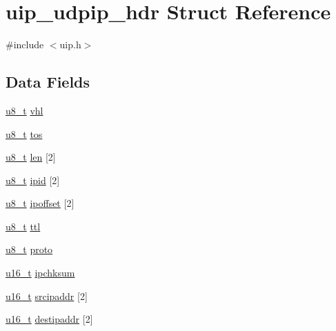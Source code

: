 \hypertarget{structuip__udpip__hdr}{
\section{uip\_\-udpip\_\-hdr Struct Reference}
\label{structuip__udpip__hdr}
}


{\ttfamily \#include $<$uip.h$>$}

\subsection*{Data Fields}
\begin{DoxyCompactItemize}
\item 
\hyperlink{group__uipfw_ga4caecabca98b43919dd11be1c0d4cd8e}{u8\_\-t} \hyperlink{structuip__udpip__hdr_af1684ad96b8acf54154688df3883b801}{vhl}
\item 
\hyperlink{group__uipfw_ga4caecabca98b43919dd11be1c0d4cd8e}{u8\_\-t} \hyperlink{structuip__udpip__hdr_aed119a030ebd3bf7c30a12071c27d441}{tos}
\item 
\hyperlink{group__uipfw_ga4caecabca98b43919dd11be1c0d4cd8e}{u8\_\-t} \hyperlink{structuip__udpip__hdr_a47140aa52cb9e6a2de38fdfc5da08df1}{len} \mbox{[}2\mbox{]}
\item 
\hyperlink{group__uipfw_ga4caecabca98b43919dd11be1c0d4cd8e}{u8\_\-t} \hyperlink{structuip__udpip__hdr_a569382bc53aa64c227e57efe88fe13ac}{ipid} \mbox{[}2\mbox{]}
\item 
\hyperlink{group__uipfw_ga4caecabca98b43919dd11be1c0d4cd8e}{u8\_\-t} \hyperlink{structuip__udpip__hdr_a8587178a29882482be20c2822b402b96}{ipoffset} \mbox{[}2\mbox{]}
\item 
\hyperlink{group__uipfw_ga4caecabca98b43919dd11be1c0d4cd8e}{u8\_\-t} \hyperlink{structuip__udpip__hdr_a6f8c65cfc8242197bcc3cb5b4735b16f}{ttl}
\item 
\hyperlink{group__uipfw_ga4caecabca98b43919dd11be1c0d4cd8e}{u8\_\-t} \hyperlink{structuip__udpip__hdr_a51bbbe3099c10ef26119ddc2aa51e35e}{proto}
\item 
\hyperlink{group__uipfw_ga77570ac4fcab86864fa1916e55676da2}{u16\_\-t} \hyperlink{structuip__udpip__hdr_af20186ef441ef5b600e8544a0f2d8d81}{ipchksum}
\item 
\hyperlink{group__uipfw_ga77570ac4fcab86864fa1916e55676da2}{u16\_\-t} \hyperlink{structuip__udpip__hdr_aa80e8d0fc768525fa3bfb3d4e4cf260d}{srcipaddr} \mbox{[}2\mbox{]}
\item 
\hyperlink{group__uipfw_ga77570ac4fcab86864fa1916e55676da2}{u16\_\-t} \hyperlink{structuip__udpip__hdr_abe2c98748e180c1747823cd2fb8ecf0e}{destipaddr} \mbox{[}2\mbox{]}

\end{DoxyCompactItemize}
